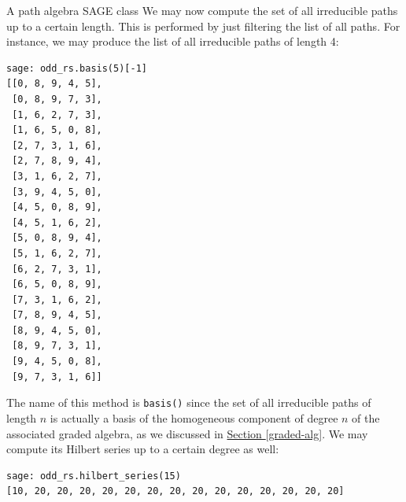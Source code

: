 \begin{chapter}{A path algebra SAGE class}
We may now compute the set of all irreducible paths up to a certain length. This is performed by just filtering the list of all paths. For instance, we may produce the list of all irreducible paths of length 4:
\begin{lstlisting}
sage: odd_rs.basis(5)[-1]
[[0, 8, 9, 4, 5],
 [0, 8, 9, 7, 3],
 [1, 6, 2, 7, 3],
 [1, 6, 5, 0, 8],
 [2, 7, 3, 1, 6],
 [2, 7, 8, 9, 4],
 [3, 1, 6, 2, 7],
 [3, 9, 4, 5, 0],
 [4, 5, 0, 8, 9],
 [4, 5, 1, 6, 2],
 [5, 0, 8, 9, 4],
 [5, 1, 6, 2, 7],
 [6, 2, 7, 3, 1],
 [6, 5, 0, 8, 9],
 [7, 3, 1, 6, 2],
 [7, 8, 9, 4, 5],
 [8, 9, 4, 5, 0],
 [8, 9, 7, 3, 1],
 [9, 4, 5, 0, 8],
 [9, 7, 3, 1, 6]]
\end{lstlisting}
The name of this method is \texttt{basis()} since the set of all irreducible paths of length $n$ is actually a basis of the homogeneous component of degree $n$ of the associated graded algebra, as we discussed in \hyperref[graded-alg]{Section \ref*{graded-alg}}. We may compute its Hilbert series up to a certain degree as well:
\begin{lstlisting}
sage: odd_rs.hilbert_series(15)
[10, 20, 20, 20, 20, 20, 20, 20, 20, 20, 20, 20, 20, 20, 20]
\end{lstlisting}
\end{chapter}